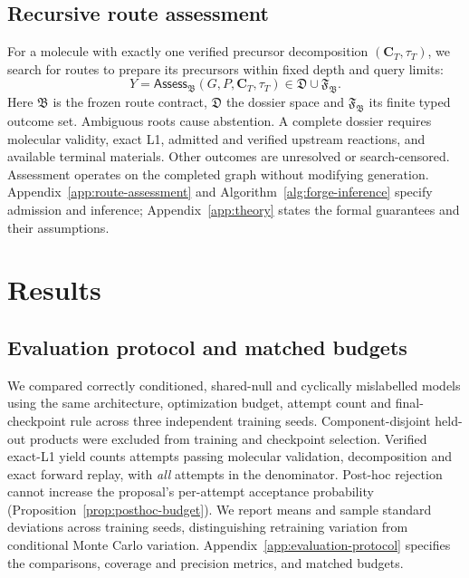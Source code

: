 \documentclass{article}
\theoremstyle{definition}
\begin{document}
\subsection{Recursive route assessment}
\label{sec:route-assessment}
For a molecule with exactly one verified precursor decomposition $(\mathbf C_T,\tau_T)$,
we search for routes to prepare its precursors within fixed depth and query limits:
\begin{equation}
    Y=\mathsf{Assess}_{\mathfrak B}(G,P,\mathbf C_T,\tau_T)
    \in\mathfrak D\cup\mathfrak F_{\mathfrak B}.
\end{equation}
Here $\mathfrak B$ is the frozen route contract, $\mathfrak D$ the dossier space and
$\mathfrak F_{\mathfrak B}$ its finite typed outcome set. Ambiguous roots cause abstention.
A complete dossier requires molecular validity, exact L1, admitted and verified upstream reactions,
and available terminal materials. Other outcomes are unresolved or search-censored. Assessment
operates on the completed graph without modifying generation. Appendix~\ref{app:route-assessment}
and Algorithm~\ref{alg:forge-inference} specify admission and inference; Appendix~\ref{app:theory}
states the formal guarantees and their assumptions.

\section{Results}
\label{sec:results}

\subsection{Evaluation protocol and matched budgets}
We compared correctly conditioned, shared-null and cyclically mislabelled models using the same
architecture, optimization budget, attempt count and final-checkpoint rule across three independent
training seeds. Component-disjoint held-out products were excluded from training and checkpoint
selection. Verified exact-L1 yield counts attempts passing molecular validation, decomposition and
exact forward replay, with \emph{all} attempts in the denominator. Post-hoc rejection cannot increase
the proposal's per-attempt acceptance probability (Proposition~\ref{prop:posthoc-budget}). We report
means and sample standard deviations across training seeds, distinguishing retraining variation from
conditional Monte Carlo variation. Appendix~\ref{app:evaluation-protocol} specifies the comparisons,
coverage and precision metrics, and matched budgets.
\end{document}
